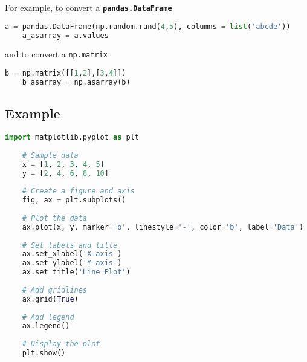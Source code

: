 For example, to convert a \texttt{\textbf{pandas.DataFrame}}

\begin{lstlisting}[language=Python, style=pythonstyle, caption={Creating a DataFrame and converting it to a NumPy array}, label={code:dataframe-to-array}]
	a = pandas.DataFrame(np.random.rand(4,5), columns = list('abcde'))
	a_asarray = a.values
\end{lstlisting}


and to convert a \texttt{np.matrix}

\begin{lstlisting}[language=Python, style=pythonstyle, caption={Converting a NumPy matrix to an array}, label={code:matrix-to-array}]
	b = np.matrix([[1,2],[3,4]])
	b_asarray = np.asarray(b)
\end{lstlisting}


\subsection{Example}

\begin{lstlisting}[language=Python, style=pythonstyle, caption={Example of a simple line plot using Matplotlib}, label={code:line-plot}]
	import matplotlib.pyplot as plt
	
	# Sample data
	x = [1, 2, 3, 4, 5]
	y = [2, 4, 6, 8, 10]
	
	# Create a figure and axis
	fig, ax = plt.subplots()
	
	# Plot the data
	ax.plot(x, y, marker='o', linestyle='-', color='b', label='Data')
	
	# Set labels and title
	ax.set_xlabel('X-axis')
	ax.set_ylabel('Y-axis')
	ax.set_title('Line Plot')
	
	# Add gridlines
	ax.grid(True)
	
	# Add legend
	ax.legend()
	
	# Display the plot
	plt.show()
\end{lstlisting}


